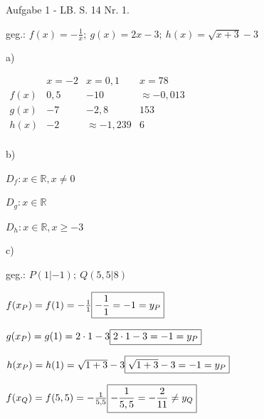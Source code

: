 \documentclass[varwidth]{article}
\begin{document}
{ \Large Aufgabe 1 - LB. S. 14 Nr. 1.}

geg.: $f(x) = -\frac1x ;~ g(x) = 2x-3 ;~ h(x) = \sqrt{x+3}-3$

\vspace*{5mm}

a)

$
\begin{array}{llll}

    ~    & x = -2 & x = 0,1 & x = 78 \\
    f(x) & 0,5 & -10 & \approx -0,013 \\
    g(x) & -7 & -2,8 & 153 \\
    h(x) & -2 & \approx -1,239 & 6 \\

\end{array}
$

\vspace*{5mm}

b)

$ D_f: x\in\mathbb R, x\neq0 $

$ D_g: x\in\mathbb R $

$ D_h: x\in\mathbb R, x\ge-3 $

\vspace*{5mm}

c)

geg.: $ P(1|-1);~ Q(5,5|8) $

\vspace*{5mm}

$
f(x_P) = f(1) = -\frac11 \\~\\
\boxed{ -\frac11 = -1 = y_P }
$

\vspace*{8mm}

$
g(x_P) = g(1) = 2\cdot1-3 \\~\\
\boxed{ 2\cdot1-3 = -1 = y_P }
$

\vspace*{8mm}

$
h(x_P) = h(1) = \sqrt{1+3}-3 \\~\\
\boxed{ \sqrt{1+3}-3 = -1 = y_P }
$

\vspace*{12mm}

$
f(x_Q) = f(5,5) = -\frac1{5,5} \\~\\
\boxed{ -\frac1{5,5} = -\frac{2}{11} \neq y_Q }
$

\vspace*{8mm}
\end{document}
